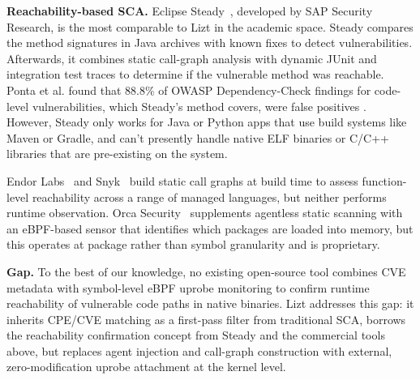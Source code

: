 \documentclass[conference]{IEEEtran}
\begin{document}
\textbf{Reachability-based SCA.} Eclipse Steady~\cite{steady}, developed by SAP Security Research, is the most comparable to Lizt in the academic space.
Steady compares the method signatures in Java archives with known fixes to detect vulnerabilities.
Afterwards, it combines static call-graph analysis with dynamic JUnit and integration test traces to determine if the vulnerable method was reachable.
Ponta et al. found that 88.8\% of OWASP Dependency-Check findings for code-level vulnerabilities, which Steady's method covers, were false positives \cite{ponta2020}.
However, Steady only works for Java or Python apps that use build systems like Maven or Gradle, and can't presently handle native ELF binaries or C/C++ libraries that are pre-existing on the system.

Endor Labs~\cite{endorlabs} and Snyk~\cite{snyk} build static call graphs at build time to assess function-level reachability across a range of managed languages, but neither performs runtime observation.
Orca Security~\cite{orca} supplements agentless static scanning with an eBPF-based sensor that identifies which packages are loaded into memory, but this operates at package rather than symbol granularity and is proprietary.

\textbf{Gap.} To the best of our knowledge, no existing open-source tool combines CVE metadata with symbol-level eBPF uprobe monitoring to confirm runtime reachability of vulnerable code paths in native binaries.
Lizt addresses this gap: it inherits CPE/CVE matching as a first-pass filter from traditional SCA, borrows the reachability confirmation concept from Steady and the commercial tools above, but replaces agent injection and call-graph construction with external, zero-modification uprobe attachment at the kernel level.

\end{document}
